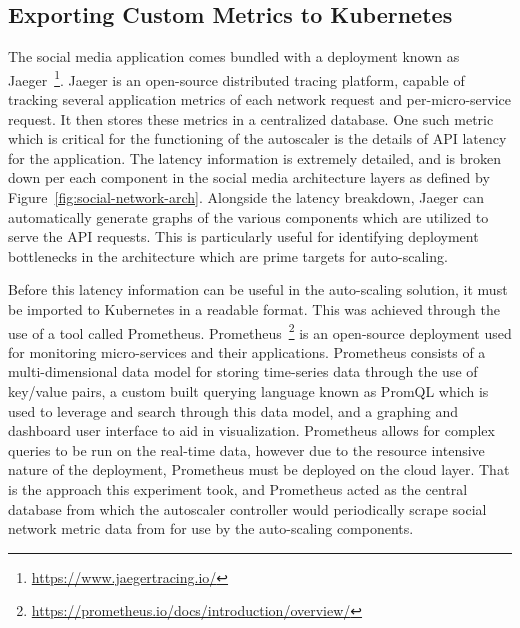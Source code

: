 \subsection{Exporting Custom Metrics to Kubernetes}
\label{subsec:metrics-export}

The social media application comes bundled with a deployment known as Jaeger~\footnote{\url{https://www.jaegertracing.io/}}. Jaeger is an open-source distributed tracing platform, capable of tracking several application metrics of each network request and per-micro-service request. It then stores these metrics in a centralized database. One such metric which is critical for the functioning of the autoscaler is the details of API latency for the application. The latency information is extremely detailed, and is broken down per each component in the social media architecture layers as defined by Figure~\ref{fig:social-network-arch}. Alongside the latency breakdown, Jaeger can automatically generate graphs of the various components which are utilized to serve the API requests. This is particularly useful for identifying deployment bottlenecks in the architecture which are prime targets for auto-scaling.\par

Before this latency information can be useful in the auto-scaling solution, it must be imported to Kubernetes in a readable format. This was achieved through the use of a tool called Prometheus. Prometheus~\footnote{\url{https://prometheus.io/docs/introduction/overview/}} is an open-source deployment used for monitoring micro-services and their applications. Prometheus consists of a multi-dimensional data model for storing time-series data through the use of key/value pairs, a custom built querying language known as PromQL which is used to leverage and search through this data model, and a graphing and dashboard user interface to aid in visualization. Prometheus allows for complex queries to be run on the real-time data, however due to the resource intensive nature of the deployment, Prometheus must be deployed on the cloud layer. That is the approach this experiment took, and Prometheus acted as the central database from which the autoscaler controller would periodically scrape social network metric data from for use by the auto-scaling components.\par

